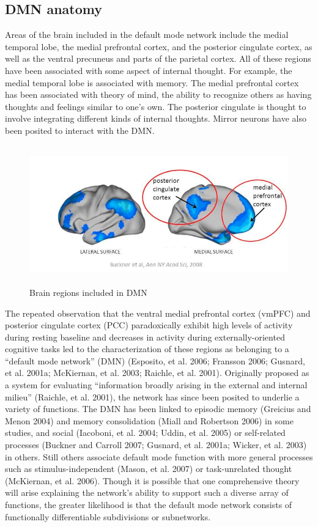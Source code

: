 \subsection{DMN anatomy}
Areas of the brain included in the default mode network include the medial temporal lobe, the medial prefrontal cortex, and the posterior cingulate cortex, as well as the ventral precuneus and parts of the parietal cortex. All of these regions have been associated with some aspect of internal thought. For example, the medial temporal lobe is associated with memory. The medial prefrontal cortex has been associated with theory of mind, the ability to recognize others as having thoughts and feelings similar to one’s own. The posterior cingulate is thought to involve integrating different kinds of internal thoughts. Mirror neurons have also been posited to interact with the DMN.
\begin{figure}
    \centering
    \includegraphics[height=6cm]{Pictures/DMN_anatomy.png}
    \caption{Brain regions included in DMN}
    \label{fig:my_label}
\end{figure}

The repeated observation that the ventral medial prefrontal cortex (vmPFC) and posterior cingulate cortex (PCC) paradoxically exhibit high levels of activity during resting baseline and decreases in activity during externally-oriented cognitive tasks led to the characterization of these regions as belonging to a “default mode network” (DMN) (Esposito, et al. 2006; Fransson 2006; Gusnard, et al. 2001a; McKiernan, et al. 2003; Raichle, et al. 2001). Originally proposed as a system for evaluating “information broadly arising in the external and internal milieu” (Raichle, et al. 2001), the network has since been posited to underlie a variety of functions. The DMN has been linked to episodic memory (Greicius and Menon 2004) and memory consolidation (Miall and Robertson 2006) in some studies, and social (Iacoboni, et al. 2004; Uddin, et al. 2005) or self-related processes (Buckner and Carroll 2007; Gusnard, et al. 2001a; Wicker, et al. 2003) in others. Still others associate default mode function with more general processes such as stimulus-independent (Mason, et al. 2007) or task-unrelated thought (McKiernan, et al. 2006). Though it is possible that one comprehensive theory will arise explaining the network’s ability to support such a diverse array of functions, the greater likelihood is that the default mode network consists of functionally differentiable subdivisions or subnetworks.

